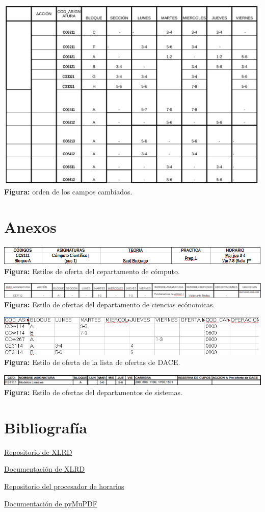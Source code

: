 \documentclass[]{article}
\begin{document}
\includegraphics{casos_pruebas/doc4PDF.png} \textbf{Figura:} orden de
los campos cambiados.

\section{Anexos}\label{anexos}

\includegraphics{Insumos2.png} \textbf{Figura:} Estilos de oferta del
cepartamento de cómputo.

\includegraphics{Insumos.png} \textbf{Figura:} Estilo de ofertas del
departamento de ciencias ecónomicas.

\includegraphics{muestra_dace.png} \textbf{Figura:} Estilo de oferta de
la lista de ofertas de DACE.

\includegraphics{Insumos3.png} \textbf{Figura:} Estilo de ofertas del
departamentos de sistemas.

\section{Bibliografía}\label{bibliografuxeda}

\href{https://github.com/python-excel/tutorial}{Repositorio de XLRD}

\href{http://xlrd.readthedocs.io/en/latest/}{Documentación de XLRD}

\href{https://github.com/javierlopm/sistemaPermisosComputacion}{Repositorio
del procesador de horarios}

\href{http://pythonhosted.org/PyMuPDF/installation.html}{Documentación
de pyMuPDF}
\end{document}
